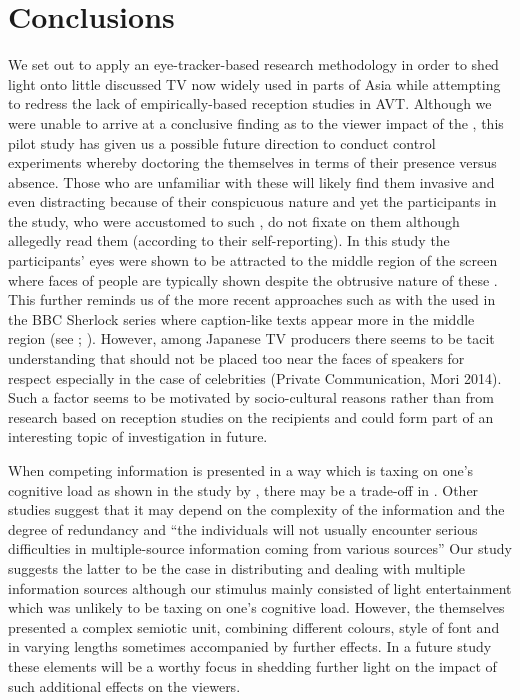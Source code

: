 \documentclass[output=paper]{langsci/langscibook}
\begin{document}
\section{Conclusions}

We set out to apply an eye-tracker-based research methodology in order to shed light onto little discussed TV  now widely used in parts of Asia while attempting to redress the lack of empirically-based reception studies in AVT. Although we were unable to arrive at a conclusive finding as to the viewer impact of the , this pilot study has given us a possible future direction to conduct control experiments whereby doctoring the  themselves in terms of their presence versus absence. Those who are unfamiliar with these  will likely find them invasive and even distracting because of their conspicuous nature and yet the participants in the study, who were accustomed to such , do not fixate on them although allegedly read them (according to their self-reporting). In this study the participants' eyes were shown to be attracted to the middle region of the screen where faces of people are typically shown despite the obtrusive nature of these . This further reminds us of the more recent approaches such as with the  used in the BBC Sherlock series where caption-like texts appear more in the middle region (see \citealt{Sasamoto2014}; \citealt{Dwyer2015}).  However, among Japanese TV producers there seems to be tacit understanding that  should not be placed too near the faces of speakers for respect especially in the case of celebrities (Private Communication, Mori 2014).  Such a factor seems to be motivated by socio-cultural reasons rather than from research based on reception studies on the recipients and could form part of an interesting topic of investigation in future. 


When competing information is presented in a way which is taxing on one's cognitive load as shown in the study by \citet{caffrey2009}, there may be a trade-off in .  Other studies \citep[265]{perego2010} suggest that it may depend on the complexity of the information and the degree of redundancy and ``the individuals will not usually encounter serious difficulties in multiple-source information coming from various sources'' Our study suggests the latter to be the case in distributing  and dealing with multiple information sources although our stimulus mainly consisted of light entertainment which was unlikely to be taxing on one's cognitive load.  However, the  themselves presented a complex semiotic unit, combining different colours, style of font and in varying lengths sometimes accompanied by further effects. In a future study these elements will be a worthy focus in shedding further light on the impact of such additional effects on the viewers. 
\end{document}
